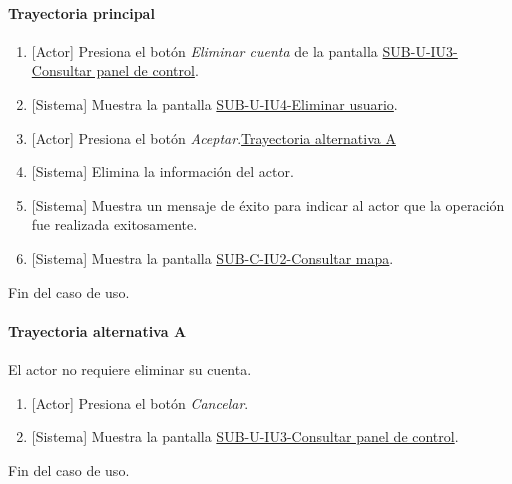 \paragraph{Trayectoria principal}
	\begin{enumerate}
		\item {[Actor]} Presiona el botón \textit{Eliminar cuenta} de la pantalla \hyperref[fig:sub-u-iu3]{SUB-U-IU3-Consultar panel de control}.
		\item {[Sistema]} Muestra la pantalla \hyperref[fig:sub-u-iu4]{SUB-U-IU4-Eliminar usuario}.
		\item {[Actor]} Presiona el botón \textit{Aceptar}.\hyperref[SUB-U-CU4:TA]{Trayectoria alternativa A}
		\item {[Sistema]} Elimina la información del actor.
		\item {[Sistema]} Muestra un mensaje de éxito para indicar al actor que la operación fue realizada exitosamente.
		\item \label{SUB-U-CU1:Pantalla} {[Sistema]} Muestra la pantalla \hyperref[fig:sub-c-iu2]{SUB-C-IU2-Consultar mapa}.
	\end{enumerate}
	Fin del caso de uso.

\paragraph{Trayectoria alternativa A} \label{SUB-U-CU4:TA}
	El actor no requiere eliminar su cuenta.
	\begin{enumerate}[label=A\arabic*.]
		\item {[Actor]} Presiona el botón \textit{Cancelar}.
		\item {[Sistema]} Muestra la pantalla \hyperref[fig:sub-u-iu3]{SUB-U-IU3-Consultar panel de control}.
	\end{enumerate}
	Fin del caso de uso.

